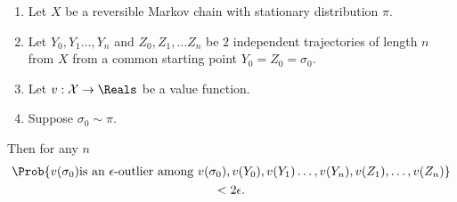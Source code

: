 \documentclass[12pt]{article}
\begin{document}
\begin{theorem}
    \label{thm:parallelsignificance:twoepstest}
    \begin{enumerate}
        \item
            Let \( X \) be a reversible Markov chain with stationary
            distribution \( \pi \).
        \item
            Let \( Y_0, Y_1 \dots, Y_n \) and \( Z_0, Z_1, \dots Z_n \)
            be \( 2 \) independent trajectories of length \( n \) from \(
            X \) from a common starting point \( Y_0 = Z_0 = \sigma_0 \).
        \item
            Let \( v :  \mathcal{X} \to \Reals \) be a value function.
        \item
            Suppose \( \sigma_0 \sim \pi \).
    \end{enumerate}
    Then for any \( n \)
    \begin{multline*}
        \Prob{v(\sigma_0) \text{is an \( \epsilon \)-outlier among } v(\sigma_0),
        v(Y_0), v(Y_1) \dots, v(Y_n), v(Z_1), \dots, v(Z_n)} \\
        < 2\epsilon.
    \end{multline*}
\end{theorem}
\end{document}
